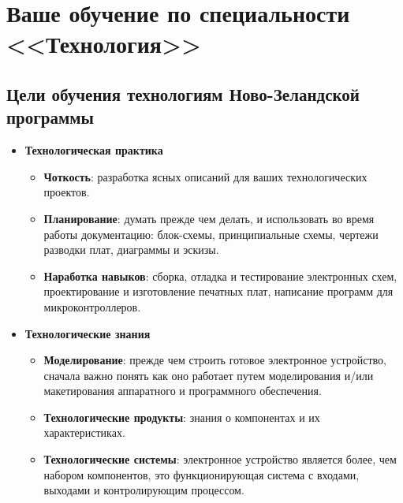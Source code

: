\section{Ваше обучение по специальности <<Технология>>}

\subsection{Цели обучения технологиям Ново-Зеландской программы}

\begin{itemize}

\item \textbf{Технологическая практика}

\begin{itemize}

\item\textbf{Чоткость}: разработка ясных описаний для ваших технологических
проектов.

\item\textbf{Планирование}: думать прежде чем делать, и использовать во время
работы документацию: блок-схемы, принципиальные схемы, чертежи разводки плат,
диаграммы и эскизы.

\item\textbf{Наработка навыков}: сборка, отладка и тестирование электронных
схем, проектирование и изготовление печатных плат, написание программ для
микроконтроллеров.

\end{itemize}

\item \textbf{Технологические знания}

\begin{itemize}

\item\textbf{Моделирование}: прежде чем строить готовое электронное устройство,
сначала важно понять как оно работает путем моделирования и/или макетирования
аппаратного и программного обеспечения.

\item\textbf{Технологические продукты}: знания о компонентах и их
характеристиках.

\item\textbf{Технологические системы}: электронное устройство является более,
чем набором компонентов, это функционирующая система с входами, выходами и
контролирующим процессом.

\end{itemize}


\end{itemize}

